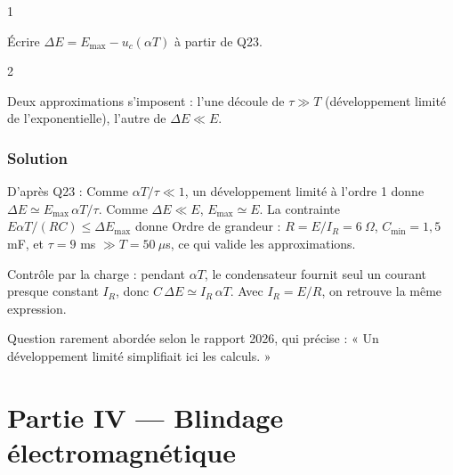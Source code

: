 \documentclass[11pt,a4paper]{article}
\newcommand{\equationajustee}[1]{%
  \sbox{\boiteequation}{$\displaystyle #1$}%
  \ifdim\wd\boiteequation>\linewidth
    \[\resizebox{\linewidth}{!}{\usebox{\boiteequation}}\]%
  \else
    \[#1\]%
  \fi}
\begin{document}
\begin{indication}{1}

Écrire \(\Delta E=E_{\max}-u_c(\alpha T)\) à partir de Q23.

\end{indication}

\begin{indication}{2}

Deux approximations s'imposent : l'une découle de \(\tau\gg T\) (développement limité de l'exponentielle), l'autre de \(\Delta E\ll E\).

\end{indication}

\hypertarget{solution-23}{%
\subsubsection{Solution}\label{solution-23}}

D'après Q23 :
\equationajustee{\Delta E=E_{\max}\big(1-e^{-\alpha T/\tau}\big) .}
Comme \(\alpha T/\tau\ll1\), un développement limité à l'ordre 1 donne \(\Delta E\simeq E_{\max}\,\alpha T/\tau\). Comme \(\Delta E\ll E\), \(E_{\max}\simeq E\). La contrainte \(E\alpha T/(RC)\le\Delta E_{\max}\) donne
\equationajustee{\boxed{C_{\min}=\frac{E\,\alpha\,T}{R\,\Delta E_{\max}}}}
Ordre de grandeur : \(R=E/I_R=6\ \Omega\), \(C_{\min}=1{,}5\) mF, et \(\tau=9\) ms \(\gg T=50\ \mu\)s, ce qui valide les approximations.

\begin{methode}

Contrôle par la charge : pendant \(\alpha T\), le condensateur fournit seul un courant presque constant \(I_R\), donc \(C\,\Delta E\simeq I_R\,\alpha T\). Avec \(I_R=E/R\), on retrouve la même expression.

\end{methode}

\begin{jury}

Question rarement abordée selon le rapport 2026, qui précise : « Un développement limité simplifiait ici les calculs. »

\end{jury}

\hypertarget{partie-iv-blindage-uxe9lectromagnuxe9tique}{%
\section{Partie IV --- Blindage électromagnétique}\label{partie-iv-blindage-uxe9lectromagnuxe9tique}}
\end{document}
